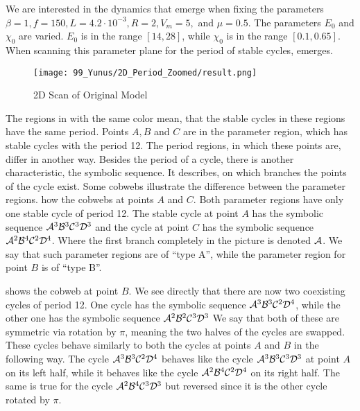 We are interested in the dynamics that emerge when fixing the parameters $\beta = 1, f = 150, L = 4.2 \cdot 10^{-3}, R = 2, V_m = 5,$ and $\mu = 0.5$.
The parameters $E_0$ and $\chi_0$ are varied.
$E_0$ is in the range $[14, 28]$, while $\chi_0$ is in the range $[0.1, 0.65]$.
When scanning this parameter plane for the period of stable cycles,  emerges.

\begin{figure}
    \centering
    \texttt{[image: 99\_Yunus/2D\_Period\_Zoomed/result.png]}
    \caption{2D Scan of Original Model}
    \label{fig:yunus.2pi.2d.full}
\end{figure}

The regions in  with the same color mean, that the stable cycles in these regions have the same period.
Points $A, B$ and $C$ are in the parameter region, which has stable cycles with the period 12.
The period regions, in which these points are, differ in another way.
Besides the period of a cycle, there is another characteristic, the symbolic sequence.
It describes, on which branches the points of the cycle exist.
Some cobwebs illustrate the difference between the parameter regions.
 how the cobwebs at points $A$ and $C$.
Both parameter regions have only one stable cycle of period 12.
The stable cycle at point $A$ has the symbolic sequence $\mathcal{A}^3\mathcal{B}^3\mathcal{C}^3\mathcal{D}^3$ and the cycle at point $C$ has the symbolic sequence $\mathcal{A}^2\mathcal{B}^4\mathcal{C}^2\mathcal{D}^4$.
Where the first branch completely in the picture is denoted $\mathcal{A}$.
We say that such parameter regions are of ``type A'', while the parameter region for point $B$ is of ``type B''.

 shows the cobweb at point $B$.
We see directly that there are now two coexisting cycles of period 12.
One cycle has the symbolic sequence $\mathcal{A}^3\mathcal{B}^3\mathcal{C}^2\mathcal{D}^4$, while the other one has the symbolic sequence $\mathcal{A}^2\mathcal{B}^2\mathcal{C}^3\mathcal{D}^3$
We say that both of these are symmetric via rotation by $\pi$, meaning the two halves of the cycles are swapped.
These cycles behave similarly to both the cycles at points $A$ and $B$ in the following way.
The cycle $\mathcal{A}^3\mathcal{B}^3\mathcal{C}^2\mathcal{D}^4$ behaves like the cycle $\mathcal{A}^3\mathcal{B}^3\mathcal{C}^3\mathcal{D}^3$ at point $A$ on its left half, while it behaves like the cycle $\mathcal{A}^2\mathcal{B}^4\mathcal{C}^2\mathcal{D}^4$ on its right half.
The same is true for the cycle $\mathcal{A}^2\mathcal{B}^4\mathcal{C}^3\mathcal{D}^3$ but reversed since it is the other cycle rotated by $\pi$.

